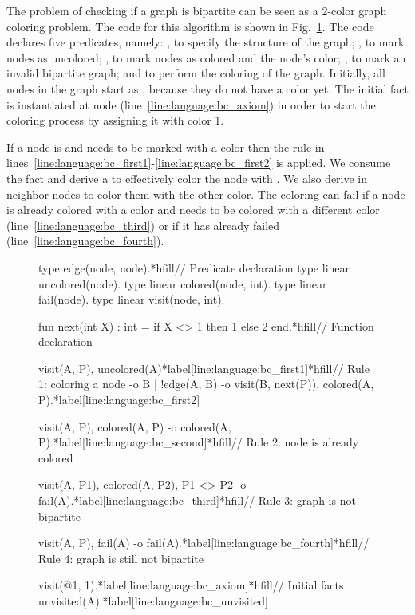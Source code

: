 The problem of checking if a graph is bipartite can be seen as a 2-color graph
coloring problem. The code for this algorithm is shown in
Fig.~\ref{language:code:bichecking}. The code declares five predicates, namely:
, to specify the structure of the graph; , to mark
nodes as uncolored; , to mark nodes as colored and the node's
color; , to mark an invalid bipartite graph; and  to
perform the coloring of the graph.  Initially, all nodes in the graph start as
, because they do not have a color yet. The initial fact
 is instantiated at node 
(line~\ref{line:language:bc_axiom}) in order to start the coloring process by
assigning it with color 1.

If a node is  and needs to be marked with a color  then
the rule in lines~\ref{line:language:bc_first1}-\ref{line:language:bc_first2} is
applied. We consume the  fact and derive a 
to effectively color the node with . We also derive  in neighbor nodes to color them with the other color.  The coloring
can fail if a node is already colored with a color  and needs to be
colored with a different color (line~\ref{line:language:bc_third}) or if it has
already failed (line~\ref{line:language:bc_fourth}).

\begin{figure}[h!]
\begin{LineCode}[commandchars=\*\[\]]
type edge(node, node).*hfill// Predicate declaration
type linear uncolored(node).
type linear colored(node, int).
type linear fail(node).
type linear visit(node, int).

fun next(int X) : int = if X <> 1 then 1 else 2 end.*hfill// Function declaration

visit(A, P), uncolored(A)*label[line:language:bc_first1]*hfill// Rule 1: coloring a node
   -o {B | !edge(A, B) -o visit(B, next(P))},
      colored(A, P).*label[line:language:bc_first2]

visit(A, P), colored(A, P) -o colored(A, P).*label[line:language:bc_second]*hfill// Rule 2: node is already colored

visit(A, P1), colored(A, P2), P1 <> P2 -o fail(A).*label[line:language:bc_third]*hfill// Rule 3: graph is not bipartite

visit(A, P), fail(A) -o fail(A).*label[line:language:bc_fourth]*hfill// Rule 4: graph is still not bipartite

visit(@1, 1).*label[line:language:bc_axiom]*hfill// Initial facts
unvisited(A).*label[line:language:bc_unvisited]
\end{LineCode}
  \label{language:code:bichecking}
\end{figure}

